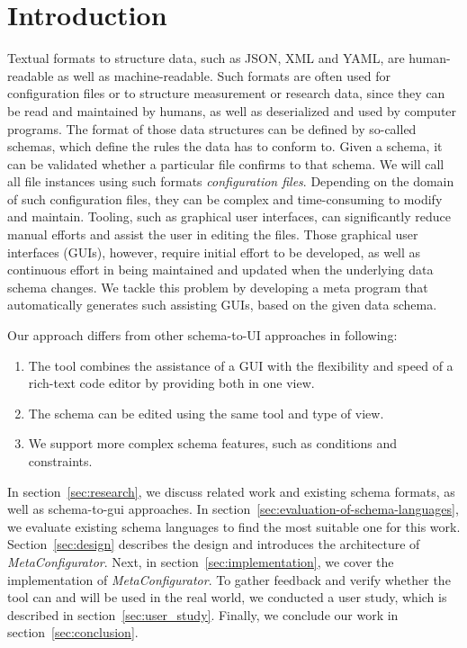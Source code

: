 \documentclass[lettersize,journal]{IEEEtran}
\newcommand{\cfgfiles}{configuration files}
\newcommand{\toolname}{\textit{MetaConfigurator}} %
\begin{document}
 \section{Introduction}\label{sec:introduction} %

 Textual formats to structure data, such as JSON, XML and YAML, are human-readable as well as machine-readable.
 Such formats are often used for configuration files or to structure measurement or research data, since they can be read and maintained by humans, as well as deserialized and used by computer programs.
 The format of those data structures can be defined by so-called schemas, which define the rules the data has to conform to.
 Given a schema, it can be validated whether a particular file confirms to that schema.
 We will call all file instances using such formats \textit{\cfgfiles}.
 Depending on the domain of such \cfgfiles, they can be complex and time-consuming to modify and maintain.
 Tooling, such as graphical user interfaces, can significantly reduce manual efforts and assist the user in editing the files.
 Those graphical user interfaces (GUIs), however, require initial effort to be developed, as well as continuous effort in being maintained and updated when the underlying data schema changes.
 We tackle this problem by developing a meta program that automatically generates such assisting GUIs, based on the given data schema.

 Our approach differs from other schema-to-UI approaches in following:

 \begin{enumerate}
  \item The tool combines the assistance of a GUI with the flexibility and speed of a rich-text code editor by providing both in one view.
  \item The schema can be edited using the same tool and type of view.
  \item We support more complex schema features, such as conditions and constraints.
 \end{enumerate}


 In section~\ref{sec:research}, we discuss related work and existing schema formats, as well as schema-to-gui approaches.
 In section~\ref{sec:evaluation-of-schema-languages}, we evaluate existing schema languages to find the most suitable one for this work.
 Section~\ref{sec:design} describes the design and introduces the architecture of \toolname{}.
 Next, in section~\ref{sec:implementation}, we cover the implementation of \toolname{}.
 To gather feedback and verify whether the tool can and will be used in the real world, we conducted a user study, which is described in section~\ref{sec:user_study}.
 Finally, we conclude our work in section~\ref{sec:conclusion}.
\end{document}
